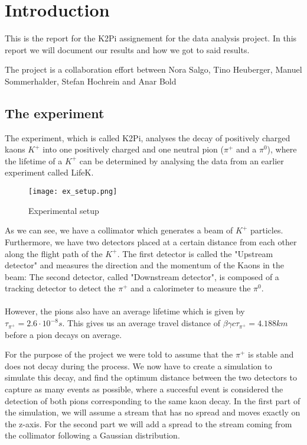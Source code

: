 \documentclass[11pt]{report}
\begin{document}
\section*{Introduction}

This is the report for the K2Pi assignement for the data analysis project. In this report we will document our results and how we got to said results.

The project is a collaboration effort between Nora Salgo, Tino Heuberger, Manuel Sommerhalder, Stefan Hochrein and Anar Bold

\subsection*{The experiment}

The experiment, which is called K2Pi, analyses the decay of positively charged kaons $K^+$ into one positively charged and one neutral pion ($\pi^+$ and a $\pi^0$), where the lifetime of a $K^+$ can be determined by analysing the data from an earlier experiment called LifeK.

\begin{figure}[h] 
\centering
\texttt{[image: ex\_setup.png]} 
\caption{Experimental setup}
\label{fig:Zee}    
\end{figure}

As we can see, we have a collimator which generates a beam of $K^+$ particles. Furthermore, we have two detectors placed at a certain distance from each other along the flight path of the $K^+$. The first detector is called the "Upstream detector" and measures the direction and the momentum of the Kaons in the beam: The second detector, called "Downstream detector", is composed of a tracking detector to detect the $\pi^+$ and a calorimeter to measure the $\pi^0$.
\\
\\
However, the pions also have an average lifetime which is given by $\tau_{\pi^+} = 2.6 \cdot 10^{-8}s$. This gives us an average travel distance of $\beta \gamma c\tau_{\pi^+} = 4.188km$ before a pion decays on average.

For the purpose of the project we were told to assume that the $\pi^+$ is stable and does not decay during the process. We now have to create a simulation to simulate this decay, and find the optimum distance between the two detectors to capture as many events as possible, where a succesful event is considered the detection of both pions corresponding to the same kaon decay. In the first part of the simulation, we will assume a stream that has no spread and moves exactly on the z-axis. For the second part we will add a spread to the stream coming from the collimator following a Gaussian distribution.
\end{document}
